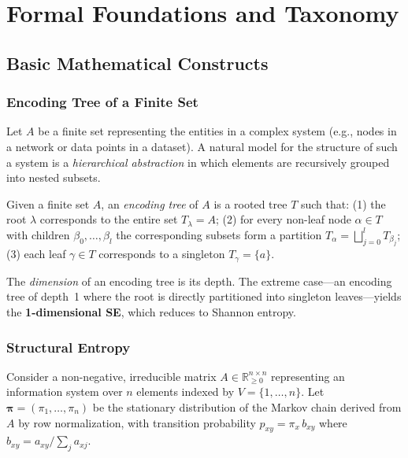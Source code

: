 \section{Formal Foundations and Taxonomy}
\label{sec:taxonomy}

\subsection{Basic Mathematical Constructs}
\label{subsec:basics}

\subsubsection{Encoding Tree of a Finite Set}

Let $A$ be a finite set representing the entities in a complex system (e.g.,
nodes in a network or data points in a dataset).
A natural model for the structure of such a system is a \emph{hierarchical
abstraction} in which elements are recursively grouped into nested subsets.

\begin{definition}
\label{def:encoding-tree}
Given a finite set $A$, an \emph{encoding tree} of $A$ is a rooted tree $T$
such that:
(1) the root $\lambda$ corresponds to the entire set $T_\lambda = A$;
(2) for every non-leaf node $\alpha\in T$ with children
    $\beta_0,\ldots,\beta_l$ the corresponding subsets form a partition
    $T_\alpha = \bigsqcup_{j=0}^l T_{\beta_j}$;
(3) each leaf $\gamma\in T$ corresponds to a singleton $T_\gamma = \{a\}$.
\end{definition}

The \emph{dimension} of an encoding tree is its depth.
The extreme case---an encoding tree of depth~1 where the root is directly
partitioned into singleton leaves---yields the \textbf{1-dimensional SE},
which reduces to Shannon entropy.

\subsubsection{Structural Entropy}

Consider a non-negative, irreducible matrix
$A\in\mathbb{R}_{\ge 0}^{n\times n}$ representing an information system over
$n$ elements indexed by $V=\{1,\ldots,n\}$.
Let $\boldsymbol\pi=(\pi_1,\ldots,\pi_n)$ be the stationary distribution of
the Markov chain derived from $A$ by row normalization, with transition
probability $p_{xy}=\pi_x\,b_{xy}$ where $b_{xy}=a_{xy}/\sum_j a_{xj}$.

